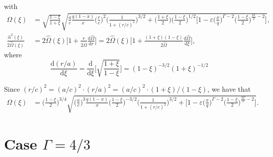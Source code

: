\documentclass[11pt]{article}
\newcommand{\rd}{\mathrm{d}}
\newcommand{\hOmega}{\widehat{\Omega}}
\newcommand{\halpha}{\widehat{\alpha}}
\begin{document}
with
\begin{align*}
\hOmega(\xi) &=\sqrt{\frac{1-\xi}{1+\xi}} \sqrt{\frac{a}{c}\frac{q(1-x)}{x}\bigg( \frac{r}{c}\bigg)^2 \bigg(\frac{1}{1+(r/c)^2}\bigg)^{3/2} 
+ \bigg(\frac{1+\xi}{2}\bigg) \bigg(\frac{1-\xi}{2}\bigg)^{1/2}  \bigg[1- \varepsilon\bigg(\frac{x}{q}\bigg)^{\Gamma-2}\bigg(\frac{1-\xi}{2}\bigg)^{\frac{3\Gamma}{2}-2} \bigg] } ,\\
\frac{\halpha^2(\xi)}{2\hOmega(\xi)} &= 2\hOmega(\xi) \bigg[1+\frac{r}{2\hOmega}\frac{\rd \hOmega }{\rd r}\bigg] = 2\hOmega(\xi) \bigg[1+\frac{(1+\xi)(1-\xi)}{2\hOmega}\frac{\rd \hOmega }{\rd \xi} \bigg],
\end{align*}
where
$$\frac{\rd(r/a)}{\rd \xi} = \frac{\rd}{\rd \xi} \bigg[\sqrt{\frac{1+\xi}{1-\xi}}\bigg] = (1-\xi)^{-3/2}(1+\xi)^{-1/2}$$

Since $(r/c)^2 = (a/c)^2 \cdot (r/a)^2 =  (a/c)^2 \cdot (1+\xi)/(1-\xi)$, we have that
\begin{align*}
\hOmega(\xi) &=\bigg(\frac{1-\xi}{2}\bigg)^{3/4}  \sqrt{\bigg( \frac{a}{c}\bigg)^3\frac{q(1-x)}{x} \bigg(\frac{1-\xi}{2}\bigg)^{-3/2} \bigg(\frac{1}{1+(r/c)^2}\bigg)^{3/2} 
+   \bigg[1- \varepsilon\bigg(\frac{x}{q}\bigg)^{\Gamma-2}\bigg(\frac{1-\xi}{2}\bigg)^{\frac{3\Gamma}{2}-2} \bigg] } .
\end{align*}

\section{Case $\Gamma=4/3$}
\end{document}
